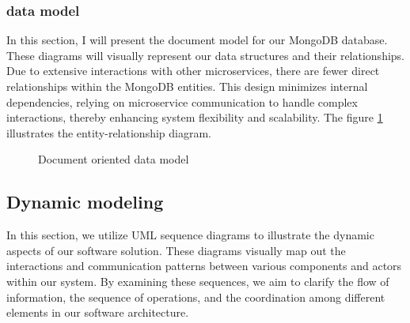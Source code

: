 \subsubsection*{data model}
In this section, I will present the document model for our MongoDB database. These diagrams will visually represent our data structures and their relationships. Due to extensive interactions with other microservices, there are fewer direct relationships within the MongoDB entities. This design minimizes internal dependencies, relying on microservice communication to handle complex interactions, thereby enhancing system flexibility and scalability.
\noindent The figure \ref{fig:database-architecture} illustrates the entity-relationship diagram.

\begin{figure}[H]
    \centering
    \caption{Document oriented data model}
    \label{fig:database-architecture}
\end{figure}

\subsection{Dynamic modeling}
In this section, we utilize UML sequence diagrams to illustrate the dynamic aspects of our software solution. These diagrams visually map out the interactions and communication patterns between various components and actors within our system. By examining these sequences, we aim to clarify the flow of information, the sequence of operations, and the coordination among different elements in our software architecture.
